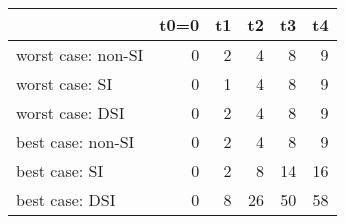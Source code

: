 \begin{tabular}{lrrrrr}
\toprule
 & t0=0 & t1 & t2 & t3 & t4 \\
\midrule
worst case: non-SI & 0 & 2 & 4 & 8 & 9 \\
worst case: SI & 0 & 1 & 4 & 8 & 9 \\
worst case: DSI & 0 & 2 & 4 & 8 & 9 \\
best case: non-SI & 0 & 2 & 4 & 8 & 9 \\
best case: SI & 0 & 2 & 8 & 14 & 16 \\
best case: DSI & 0 & 8 & 26 & 50 & 58 \\
\bottomrule
\end{tabular}
